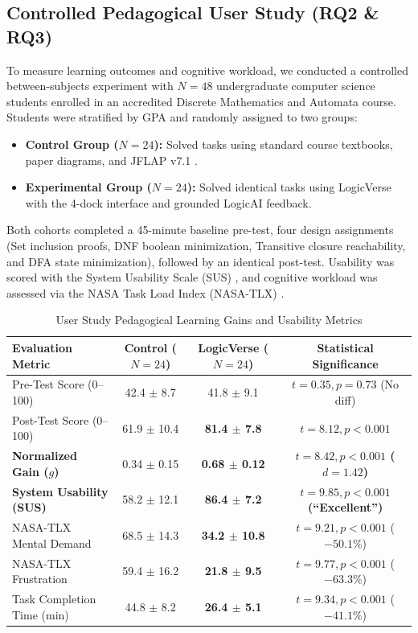 \documentclass[conference]{IEEEtran}
\begin{document}
\subsection{Controlled Pedagogical User Study (RQ2 \& RQ3)}
To measure learning outcomes and cognitive workload, we conducted a controlled between-subjects experiment with $N = 48$ undergraduate computer science students enrolled in an accredited Discrete Mathematics and Automata course. Students were stratified by GPA and randomly assigned to two groups:
\begin{itemize}
    \item \textbf{Control Group ($N = 24$):} Solved tasks using standard course textbooks, paper diagrams, and JFLAP v7.1 \cite{rodger2006jflap}.
    \item \textbf{Experimental Group ($N = 24$):} Solved identical tasks using LogicVerse with the 4-dock interface and grounded LogicAI feedback.
\end{itemize}

Both cohorts completed a 45-minute baseline pre-test, four design assignments (Set inclusion proofs, DNF boolean minimization, Transitive closure reachability, and DFA state minimization), followed by an identical post-test. Usability was scored with the System Usability Scale (SUS) \cite{brooke1996sus}, and cognitive workload was assessed via the NASA Task Load Index (NASA-TLX) \cite{hart1988nasa}.

\begin{table}[htbp]
\centering
\caption{User Study Pedagogical Learning Gains and Usability Metrics}
\label{tab:userstudy}
\begin{tabular}{lccc}
\toprule
\textbf{Evaluation Metric} & \textbf{Control ($N=24$)} & \textbf{LogicVerse ($N=24$)} & \textbf{Statistical Significance} \\
\midrule
Pre-Test Score (0--100) & 42.4 $\pm$ 8.7 & 41.8 $\pm$ 9.1 & $t = 0.35, p = 0.73$ (No diff) \\
Post-Test Score (0--100) & 61.9 $\pm$ 10.4 & \textbf{81.4 $\pm$ 7.8} & \textbf{$t = 8.12, p < 0.001$} \\
\textbf{Normalized Gain ($g$)} & 0.34 $\pm$ 0.15 & \textbf{0.68 $\pm$ 0.12} & \textbf{$t = 8.42, p < 0.001$ ($d = 1.42$)} \\
\textbf{System Usability (SUS)} & 58.2 $\pm$ 12.1 & \textbf{86.4 $\pm$ 7.2} & \textbf{$t = 9.85, p < 0.001$ (``Excellent'')} \\
NASA-TLX Mental Demand & 68.5 $\pm$ 14.3 & \textbf{34.2 $\pm$ 10.8} & $t = 9.21, p < 0.001$ ($-50.1\%$) \\
NASA-TLX Frustration & 59.4 $\pm$ 16.2 & \textbf{21.8 $\pm$ 9.5} & $t = 9.77, p < 0.001$ ($-63.3\%$) \\
Task Completion Time (min) & 44.8 $\pm$ 8.2 & \textbf{26.4 $\pm$ 5.1} & $t = 9.34, p < 0.001$ ($-41.1\%$) \\
\bottomrule
\end{tabular}
\end{table}
\end{document}
